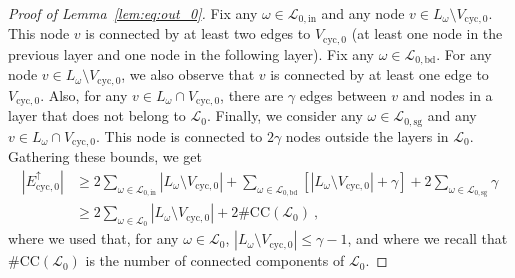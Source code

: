 \documentclass[final]{colt2026}
\newcommand{\1}{\mathbf{1}}
\begin{document}
\begin{proof}[Proof of Lemma~\ref{lem:eq:out_0}]
Fix any $\omega\in \mathcal{L}_{0,\mathrm{in}}$ and any node $v\in L_\omega\setminus V_{\mathrm{cyc},0}$. This node $v$ is connected by at least two edges to $V_{\mathrm{cyc},0}$ (at least one node in the previous layer and one node in the following layer). Fix any $\omega\in\mathcal{L}_{0,\mathrm{bd}}$. For any node $v\in L_\omega\setminus V_{\mathrm{cyc},0}$, we also observe that $v$ is connected by at least one edge to $V_{\mathrm{cyc},0}$. Also, for any $v\in L_{\omega}\cap V_{\mathrm{cyc},0}$, there are $\gamma$ edges between $v$ and nodes in a layer that does not belong to $\mathcal{L}_0$. Finally, we consider any $\omega\in \mathcal{L}_{0,\mathrm{sg}}$  and any $v\in L_{\omega}\cap V_{\mathrm{cyc},0}$. This node is connected to $2\gamma$ nodes outside the layers in $\mathcal{L}_0$. Gathering these bounds, we get
\begin{align}\nonumber
|E_{\mathrm{cyc},0}^{\uparrow}|&\geq 2 \sum_{\omega\in\mathcal{L}_{0,\mathrm{in}}}|L_{\omega}\setminus V_{\mathrm{cyc},0}|+ \sum_{\omega\in\mathcal{L}_{0,\mathrm{bd}}}[|L_{\omega}\setminus V_{\mathrm{cyc},0}| + \gamma]  +  2\sum_{\omega\in\mathcal{L}_{0,\mathrm{sg}}}\gamma  \\
& \geq 2 \sum_{\omega\in\mathcal{L}_{0}}|L_{\omega}\setminus V_{\mathrm{cyc},0}| + 2\#\mathrm{CC}(\mathcal L_0)\  , \label{eq:lower:E:cyc,0,up}
\end{align}
where we used that, for any $\omega\in \mathcal{L}_{0}$, $|L_{\omega}\setminus V_{\mathrm{cyc},0}|\leq \gamma - 1$, and where we recall that $\#\mathrm{CC}(\mathcal L_0)$ is the number of connected components of $\mathcal{L}_0$. 

\smallskip 



\end{proof}
\end{document}
